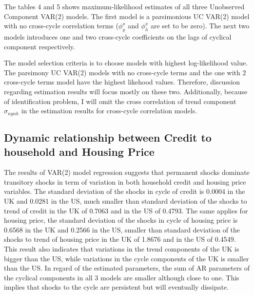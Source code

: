 \documentclass[
  12pt,
]{article}
\begin{document}
        \clearpage
        
            
        The tables 4 and 5 shows maximum-likelihood estimates of all three Unobserved Component VAR(2) models. The first model is a parsimonious UC VAR(2) model with no cross-cycle correlation terms ($\phi^x_y$ and $\phi^x_h$ are set to be zero). The next two models introduces one and two cross-cycle coefficients on the lags of cyclical component respectively. 
        
        The model selection criteria is to choose models with highest log-likelihood value. The parsimony UC VAR(2) models with no cross-cycle terms and the one with 2 cross-cycle terms model have the highest likehood values. Therefore, discussion regarding estimation results will focus mostly on these two. Additionally, because of identification problem, I will omit the cross correlation of trend component $\sigma_{nynh}$ in the estimation results for cross-cycle correlation models.
        
        \subsection{Dynamic relationship between Credit to household and Housing Price}
        
        The results of VAR(2) model regression suggests that permanent shocks dominate transitory shocks in term of variation in both household credit and housing price variables. The standard deviation of the shocks in cycle of credit is 0.0004 in the UK and 0.0281 in the US, much smaller than standard deviation of the shocks to trend of credit in the UK of 0.7063 and in the US of 0.4793. The same applies for housing price, the standard deviation of the shocks in cycle of housing price is 0.6568 in the UK and 0.2566 in the US, smaller than standard deviation of the shocks to trend of housing price in the UK of 1.8676 and in the US of 0.4549. This result also indicates that variations in the trend components of the UK is bigger than the US, while variations in the cycle components of the UK is smaller than the US. In regard of the estimated parameters, the sum of AR parameters of the cyclical components in all 3 models are smaller although close to one. This implies that shocks to the cycle are persistent but will eventually dissipate.
        
\end{document}
